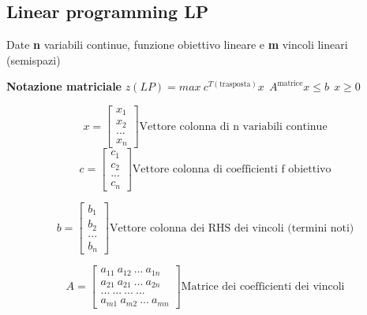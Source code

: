 \chapter{}
\section{Linear programming LP}
Date \textbf{n} variabili continue, funzione 
obiettivo lineare e \textbf{m} vincoli lineari (semispazi)

\textbf{Notazione matriciale}\newline
$z(LP)=max\ c^{T (\text{trasposta})}x \ \ A^{\text{matrice}}x \leq b \ \ x \geq 0$

$$
x=\begin{bmatrix}
x_1\\
x_2\\ ...\\ x_n
\end{bmatrix} \text{Vettore colonna di n variabili continue}
$$
$$
c=\begin{bmatrix}
c_1\\
c_2\\ ...\\ c_n
\end{bmatrix} \text{Vettore colonna di coefficienti f obiettivo}
$$

$$
b=\begin{bmatrix}
b_1\\
b_2\\ ...\\ b_n
\end{bmatrix} \text{Vettore colonna dei RHS dei vincoli (termini noti)}
$$

$$
A=\begin{bmatrix}
a_{11}\ a_{12}\ ...\ a_{1n}\\
a_{21}\ a_{21}\ ... \ a_{2n}\\ 
...\ ...\ ...\ ...\\ 
a_{m1}\ a_{m2}\ ...\ a_{mn}
\end{bmatrix} \text{Matrice dei coefficienti dei vincoli}
$$


